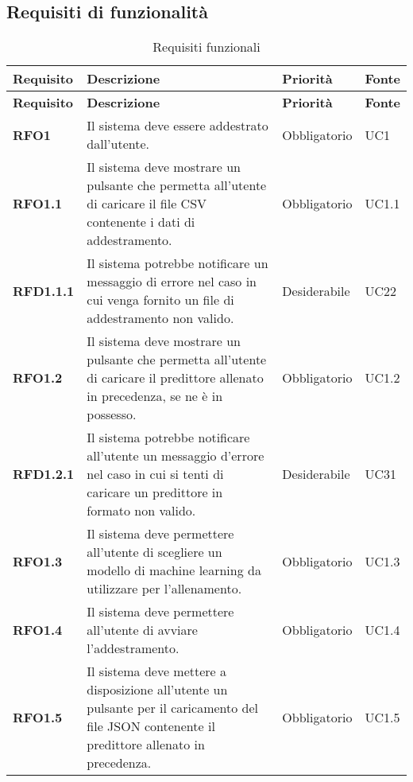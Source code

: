 \subsection{Requisiti di funzionalità}
\label{sub:requisiti_di_funzionalita}

\renewcommand{\arraystretch}{2} %
\begin{longtable}[H]{>{\centering\bfseries}m{2cm} >{\centering}m{9cm} >{\centering}m{2.5cm} >{\centering\arraybackslash}m{2.5cm}}
  \caption{Requisiti funzionali}%
  \label{tab:requisiti_funzionali}                                                    \\
  \rowcolor{lightgray}
  {\textbf{Requisito}} & {\textbf{Descrizione}} & {\textbf{Priorità}} & {\textbf{Fonte}}  \\
  \endfirsthead%
  \rowcolor{lightgray}
  {\textbf{Requisito}} & {\textbf{Descrizione}} & {\textbf{Priorità}} & {\textbf{Fonte}}  \\
  \endhead%
  \rowcolor{white}
  \multicolumn{4}{c}{\textit{Continua alla pagina successiva}}
  \endfoot%
  \endlastfoot%
  \textbf{RFO1} & Il sistema deve essere addestrato dall'utente. & Obbligatorio & UC1 \\
  \textbf{RFO1.1} & Il sistema deve mostrare un pulsante che permetta all'utente di caricare il file CSV contenente i dati di addestramento.  & Obbligatorio & UC1.1 \\
  \textbf{RFD1.1.1} & Il sistema potrebbe notificare un messaggio di errore nel caso in cui venga fornito un file di addestramento non valido. & Desiderabile & UC22 \\
  \textbf{RFO1.2} & Il sistema deve mostrare un pulsante che permetta all'utente di caricare il predittore allenato in precedenza, se ne è in possesso. & Obbligatorio & UC1.2 \\
  \textbf{RFD1.2.1} & Il sistema potrebbe notificare all'utente un messaggio d'errore nel caso in cui si tenti di caricare un predittore in formato non valido. & Desiderabile & UC31 \\
  \textbf{RFO1.3} & Il sistema deve permettere all'utente di scegliere un modello di machine learning da utilizzare per l'allenamento. & Obbligatorio & UC1.3 \\
  \textbf{RFO1.4} & Il sistema deve permettere all'utente di avviare l'addestramento. & Obbligatorio & UC1.4 \\
  \textbf{RFO1.5} & Il sistema deve mettere a disposizione all’utente un pulsante per il caricamento del file JSON contenente il predittore allenato in precedenza. & Obbligatorio & UC1.5 \\

\end{longtable}
